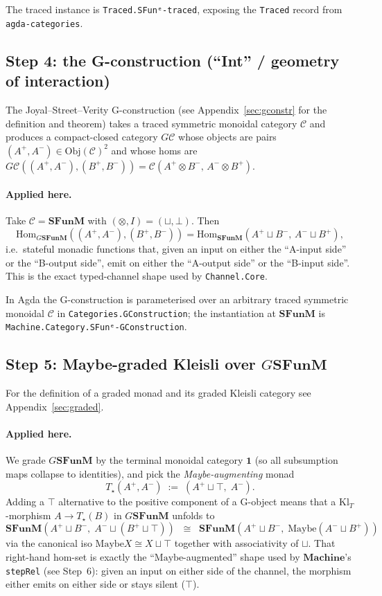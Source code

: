 \documentclass[11pt]{article}
\newcommand{\SFunM}{\mathbf{SFunM}}
\newcommand{\Hom}{\mathrm{Hom}}
\newcommand{\Obj}{\mathrm{Obj}}
\newcommand{\Machine}{\mathbf{Machine}}
\newcommand{\Maybe}{\mathrm{Maybe}}
\begin{document}
The traced instance is \texttt{Traced.SFunᵉ-traced}, exposing the
\texttt{Traced} record from \texttt{agda-categories}.

\subsection{Step 4: the G-construction (``Int'' / geometry of interaction)}

The Joyal--Street--Verity G-construction (see
Appendix~\ref{sec:gconstr} for the definition and theorem) takes a
traced symmetric monoidal category $\mathcal{C}$ and produces a
compact-closed category $G\mathcal{C}$ whose objects are pairs
$(A^+, A^-) \in \Obj(\mathcal{C})^2$ and whose homs are
$G\mathcal{C}((A^+, A^-), (B^+, B^-)) = \mathcal{C}(A^+ \otimes B^-,\,
A^- \otimes B^+)$.

\paragraph{Applied here.}  Take $\mathcal{C} = \SFunM$ with
$(\otimes, I) = (\sqcup, \bot)$.  Then
\[
  \Hom_{G\SFunM}((A^+, A^-), (B^+, B^-))
  = \Hom_\SFunM(A^+ \sqcup B^-,\, A^- \sqcup B^+),
\]
i.e.\ stateful monadic functions that, given an input on either the
``A-input side'' or the ``B-output side'', emit on either the
``A-output side'' or the ``B-input side''.  This is the exact
typed-channel shape used by \texttt{Channel.Core}.

In Agda the G-construction is parameterised over an arbitrary traced
symmetric monoidal $\mathcal{C}$ in \texttt{Categories.GConstruction};
the instantiation at $\SFunM$ is
\texttt{Machine.Category.SFunᵉ-GConstruction}.

\subsection{Step 5: Maybe-graded Kleisli over $G\SFunM$}

For the definition of a graded monad and its graded Kleisli
category see Appendix~\ref{sec:graded}.

\paragraph{Applied here.}  We grade $G\SFunM$ by the terminal
monoidal category $\mathbf{1}$ (so all subsumption maps collapse
to identities), and pick the \emph{Maybe-augmenting} monad
\[
  T_\star(A^+, A^-) \;:=\; (A^+ \sqcup \top,\; A^-).
\]
Adding a $\top$ alternative to the positive component of a G-object
means that a $\mathrm{Kl}_T$-morphism
$A \to T_\star(B)$ in $G\SFunM$ unfolds to
\[
  \SFunM(A^+ \sqcup B^-,\; A^- \sqcup (B^+ \sqcup \top))
  \;\;\cong\;\;
  \SFunM(A^+ \sqcup B^-,\; \Maybe(A^- \sqcup B^+))
\]
via the canonical iso $\Maybe X \cong X \sqcup \top$ together with
associativity of $\sqcup$.  That right-hand hom-set is exactly the
``$\Maybe$-augmented'' shape used by $\Machine$'s \texttt{stepRel}
(see Step~6): given an input on either side of the channel, the
morphism either emits on either side or stays silent ($\top$).
\end{document}
